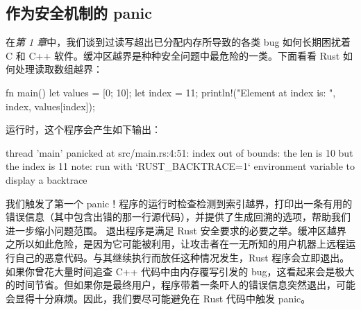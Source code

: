 \subsection{作为安全机制的 panic}
\label{idx:idx_0605ff5f}
在\emph{第 1 章}中，我们谈到过读写超出已分配内存所导致的各类 bug 如何长期困扰着 C 和 C++ 软件。缓冲区越界是种种安全问题中最危险的一类。下面看看 Rust 如何处理读取数组越界：
\begin{codebox}[rust]
fn main() {
    let values = [0; 10];
    let index = 11;
    println!("Element at index {} is: {}", index, values[index]);
}
\end{codebox}
运行时，这个程序会产生如下输出：
\begin{codeboxdark}
thread 'main' panicked at src/main.rs:4:51:
index out of bounds: the len is 10 but the index is 11
note: run with `RUST_BACKTRACE=1` environment variable to display a backtrace
\end{codeboxdark}
我们触发了第一个 panic！程序的运行时检查检测到索引越界，打印出一条有用的错误信息（其中包含出错的那一行源代码），并提供了生成回溯的选项，帮助我们进一步缩小问题范围。
退出程序是满足 Rust 安全要求的必要之举。缓冲区越界之所以如此危险，是因为它可能被利用，让攻击者在一无所知的用户机器上远程运行自己的恶意代码。与其继续执行而放任这种情况发生，Rust 程序会立即退出。
\label{idx:idx_f7760088}
如果你曾花大量时间追查 C++ 代码中由内存覆写引发的 bug，这看起来会是极大的时间节省。但如果你是最终用户，程序带着一条吓人的错误信息突然退出，可能会显得十分麻烦。因此，我们要尽可能避免在 Rust 代码中触发 panic。
